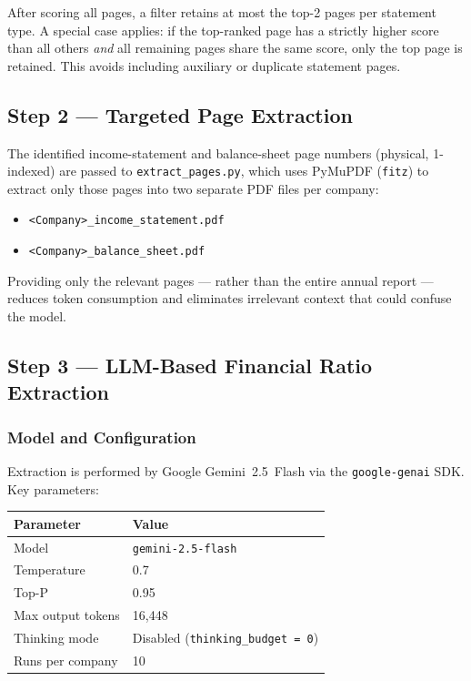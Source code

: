 \documentclass[12pt, a4paper]{article}
\begin{document}
After scoring all pages, a filter retains at most the top-2 pages per
statement type.  A special case applies: if the top-ranked page has a
strictly higher score than all others \emph{and} all remaining pages share
the same score, only the top page is retained.  This avoids including
auxiliary or duplicate statement pages.

\subsection{Step 2 — Targeted Page Extraction}
\label{sec:step2}

The identified income-statement and balance-sheet page numbers (physical,
1-indexed) are passed to \texttt{extract\_pages.py}, which uses PyMuPDF
(\texttt{fitz}) to extract only those pages into two separate PDF files per
company:

\begin{itemize}[noitemsep]
  \item \texttt{<Company>\_income\_statement.pdf}
  \item \texttt{<Company>\_balance\_sheet.pdf}
\end{itemize}

Providing only the relevant pages --- rather than the entire annual report ---
reduces token consumption and eliminates irrelevant context that could confuse
the model.

\subsection{Step 3 — LLM-Based Financial Ratio Extraction}
\label{sec:step3}

\subsubsection{Model and Configuration}

Extraction is performed by Google Gemini~2.5~Flash via the
\texttt{google-genai} SDK.  Key parameters:

\begin{center}
\begin{tabular}{ll}
\toprule
\textbf{Parameter} & \textbf{Value} \\
\midrule
Model              & \texttt{gemini-2.5-flash} \\
Temperature        & 0.7 \\
Top-P              & 0.95 \\
Max output tokens  & 16{,}448 \\
Thinking mode      & Disabled (\texttt{thinking\_budget = 0}) \\
Runs per company   & 10 \\
\bottomrule
\end{tabular}
\end{center}
\end{document}
